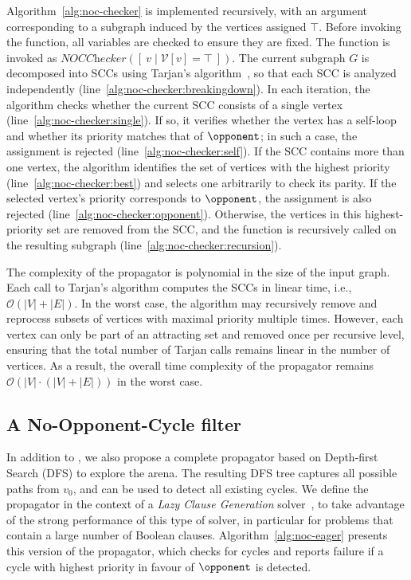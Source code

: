 \documentclass[runningheads]{llncs}
\begin{document}
Algorithm~\ref{alg:noc-checker} is implemented recursively, with an argument corresponding to a subgraph induced by the vertices assigned $\top$. Before invoking the function, all variables are checked to ensure they are fixed. The function is invoked as $\textit{NOCChecker}([\ { v \mid \mathcal{V}[v] = \top }\ ])$. The current subgraph $G$ is decomposed into SCCs using Tarjan’s algorithm~\cite{Tarjan:1972}, so that each SCC is analyzed independently (line~\ref{alg:noc-checker:breakingdown}).
%
In each iteration, the algorithm checks whether the current SCC consists of a single vertex (line~\ref{alg:noc-checker:single}). If so, it verifies whether the vertex has a self-loop and whether its priority matches that of $\opponent$; in such a case, the assignment is rejected (line~\ref{alg:noc-checker:self}).
%
If the SCC contains more than one vertex, the algorithm identifies the set of vertices with the highest priority (line~\ref{alg:noc-checker:best}) and selects one arbitrarily to check its parity. If the selected vertex’s priority corresponds to $\opponent$, the assignment is also rejected (line~\ref{alg:noc-checker:opponent}). Otherwise, the vertices in this highest-priority set are removed from the SCC, and the function is recursively called on the resulting subgraph (line~\ref{alg:noc-checker:recursion}).

The complexity of the \nocchecker propagator is polynomial in the size of the input graph. Each call to Tarjan's algorithm computes the SCCs in linear time, i.e., $\mathcal{O}(|V| + |E|)$. In the worst case, the algorithm may recursively remove and reprocess subsets of vertices with maximal priority multiple times. However, each vertex can only be part of an attracting set and removed once per recursive level, ensuring that the total number of Tarjan calls remains linear in the number of vertices. As a result, the overall time complexity of the propagator remains $\mathcal{O}(|V| \cdot (|V| + |E|))$ in the worst case.

\subsection{A No-Opponent-Cycle filter} \label{sec:nocfilter}
In addition to \nocchecker, we also propose a complete propagator based on Depth-first Search (DFS) to explore the arena. The resulting DFS tree captures all possible paths from $v_0$, and can be used to detect all existing cycles. We define the propagator in the context of a \textit{Lazy Clause Generation} solver~\cite{DBLP:journals/constraints/OhrimenkoSC09}, to take advantage of the strong performance of this type of solver, in particular for problems that contain a large number of Boolean clauses. Algorithm~\ref{alg:noc-eager} presents this version of the propagator, which checks for cycles and reports failure if a cycle with highest priority in favour of $\opponent$ is detected.
\end{document}
